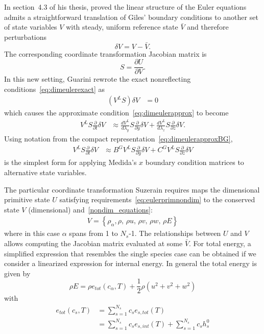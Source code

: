 In section~4.3 of his thesis, \citet{Guarini1998} proved the linear
structure of the Euler equations admits a straightforward translation of Giles'
boundary conditions to another set of state variables $V$ with steady, uniform
reference state $\bar{V}$ and therefore perturbations
\[
  \delta{}V = V - \bar{V}.
\]
The corresponding coordinate transformation Jacobian matrix is
\[
   S = \frac{\partial{}U}{\partial{}V}
   .
\]
In this new setting, Guarini rewrote the exact nonreflecting
conditions~\eqref{eq:dimeulerexact} as
\begin{align}
  \left(V^L S\right) \delta{}V &= 0
\end{align}
which causes the approximate condition~\eqref{eq:dimeulerapprox} to become
\begin{align}
\label{eq:dimeulertransform}
  V^L
  S
  \frac{\partial}{\partial{}t}
  \delta{}V
  &\approx
  \frac{dV^L}{d\lambda_y}
  S
  \frac{\partial}{\partial{}y}
  \delta{}V
  +
  \frac{dV^L}{d\lambda_z}
  S
  \frac{\partial}{\partial{}z}
  \delta{}V
  .
\end{align}
Using notation from the compact representation~\eqref{eq:dimeulerapproxBG},
\begin{align}
\label{eq:dimeulertransformcharnot}
  V^L S
  \frac{\partial}{\partial{}t}
  \delta{}V
  &\approx
  B^G V^L S
  \frac{\partial}{\partial{}y}
  \delta{}V
  +
  C^G V^L S
  \frac{\partial}{\partial{}z}
  \delta{}V
\end{align}
is the simplest form for applying Medida's $x$ boundary condition matrices to
alternative state variables.

The particular coordinate transformation Suzerain requires maps the dimensional
primitive state $U$ satisfying requirements~\eqref{eq:eulerprimnondim} to the
conserved state $V$ (dimensional) and~\ref{nondim_equations}:
%
\begin{align}
\label{eq:multieulerconsdim}
V
= \left\{
    \rho_\alpha,
    \rho,
  \,\rho u,
  \,\rho v,
  \,\rho w,
  \,\rho E
\right\}
\end{align}
%
where in this case $\alpha$ spans from 1 to $N_s$-1.
The relationships between $U$ and $V$ allows computing the Jacobian matrix
evaluated at some $\bar{V}$.  For total energy, a simplified expression that
resembles the single species case can be obtained if we consider a linearized
expression for internal energy. In general the total energy is given by
%
\begin{equation}
\rho E = \rho e_{tot}(c_\alpha, T) + \frac{1}{2} \rho \left( u^2 + v^2+ w^2 \right)
\end{equation}
%
with 
%
\begin{equation}
\begin{split}
e_{tot}(c_s, T) 
&= \sum_{s=1}^{N_s} c_s e_{s,tot}(T)  \\
&= \sum_{s=1}^{N_s} c_s e_{s,int}(T) + \sum_{s=1}^{N_s} c_s h^0_s 
\end{split}
\end{equation}
%

